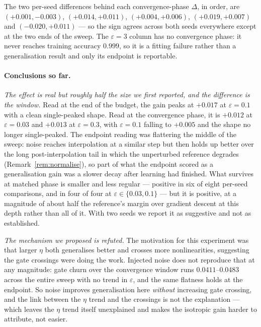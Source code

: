 \documentclass{article} %
\theoremstyle{plain}
\theoremstyle{definition}
\theoremstyle{remark}
\begin{document}
\noindent The two per-seed differences behind each convergence-phase $\Delta$, in order, are
$(+0.001, -0.003)$, $(+0.014, +0.011)$, $(+0.004, +0.006)$, $(+0.019, +0.007)$ and
$(-0.020, +0.011)$ --- so the sign agrees across both seeds everywhere except at the two ends of
the sweep. The $\varepsilon = 3$ column has no convergence phase: it never reaches training
accuracy $0.999$, so it is a fitting failure rather than a generalisation result and only its
endpoint is reportable.

\paragraph{Conclusions so far.}
\emph{The effect is real but roughly half the size we first reported, and the difference is the
window.} Read at the end of the budget, the gain peaks at $+0.017$ at $\varepsilon = 0.1$ with a
clean single-peaked shape. Read at the convergence phase, it is $+0.012$ at $\varepsilon = 0.03$ and
$+0.013$ at $\varepsilon = 0.3$, with $\varepsilon = 0.1$ falling to $+0.005$ and the shape no
longer single-peaked. The endpoint reading was flattering the middle of the sweep: noise reaches
interpolation at a similar step but then holds up better over the long post-interpolation tail in
which the unperturbed reference degrades (Remark~\ref{rem:normalise}), so part of what the endpoint
scored as a generalisation gain was a slower decay after learning had finished. What survives at
matched phase is smaller and less regular --- positive in six of eight per-seed comparisons, and in
four of four at $\varepsilon \in \{0.03, 0.1\}$ --- but it is positive, at a magnitude of about half
the reference's margin over gradient descent at this depth rather than all of it. With two seeds we
report it as suggestive and not as established.

\emph{The mechanism we proposed is refuted.} The motivation for this experiment was that larger
$\eta$ both generalises better and crosses more nonlinearities, suggesting the gate crossings were
doing the work. Injected noise does not reproduce that at any magnitude: gate churn over the
convergence window runs $0.0411$--$0.0483$ across the entire sweep with no trend in $\varepsilon$,
and the same flatness holds at the endpoint. So noise improves generalisation here \emph{without}
increasing gate crossing, and the link between the $\eta$ trend and the crossings is not the
explanation --- which leaves the $\eta$ trend itself unexplained and makes the isotropic gain harder
to attribute, not easier.
\end{document}
